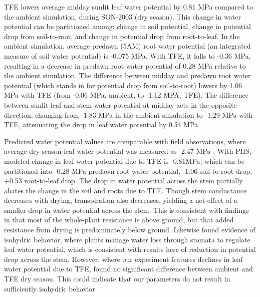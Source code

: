 \documentclass[draft,linenumbers]{agujournal}
\begin{document}
    TFE lowers average midday sunlit leaf water potential by 0.81 MPa compared to the ambient simulation, during SON-2003 (dry season).
    This change in water potential can be partitioned among: change in soil potential, change in potential drop from soil-to-root, and change in potential drop from root-to-leaf. 
    In the ambient simulation, average predawn (5AM) root water potential (an integrated measure of soil water potential) is -0.075 MPa. 
    With TFE, it falls to -0.36 MPa, resulting in a decrease in predawn root water potential of 0.28 MPa relative to the ambient simulation. 
    The difference between midday and predawn root water potential (which stands in for potential drop from soil-to-root) 
    lowers by 1.06 MPa with TFE (from -0.06 MPa, ambient, to -1.12 MPA, TFE).
    The difference between sunlit leaf and stem water potential at midday acts in the opposite direction, changing from
    -1.83 MPa in the ambient simulation to -1.29 MPa with TFE, attenuating the drop in leaf water potential by 0.54 MPa.
    
    Predicted water potential values are comparable with field observations, where average dry season leaf water potential was measured as -2.47 MPa \citep{fisher2006}.
    With PHS, modeled change in leaf water potential due to TFE is -0.81MPa, which can be partitioned into -0.28 MPa predawn root water potential, -1.06 soil-to-root drop, +0.53 root-to-leaf drop.
    The drop in water potential across the stem partially abates the change in the soil and roots due to TFE. 
    Though stem conductance decreases with drying, transpiration also decreases, yielding a net effect of a smaller drop in water potential across the stem.
    This is consistent with findings in \cite{fisher2006} that most of the whole-plant resistance is above ground, but that added resistance from drying is predominately below ground.
    Likewise \cite{fisher2006} found evidence of isohydric behavior, where plants manage water loss through stomata to regulate leaf water potential, 
    which is consistent with results here of reduction in potential drop across the stem.
    However, where our experiment features declines in leaf water potential due to TFE, \cite{fisher2006} found no significant difference between ambient and TFE dry season.
    This could indicate that our parameters do not result in sufficiently isohydric behavior.
    
\end{document}
